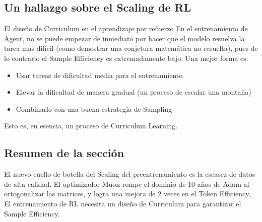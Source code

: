 \subsection{Un hallazgo sobre el Scaling de RL}

\begin{knowledgebox}{El diseño de Curriculum en el aprendizaje por refuerzo}
En el entrenamiento de Agent, no se puede empezar de inmediato por hacer que el modelo resuelva la tarea más difícil (como demostrar una conjetura matemática no resuelta), pues de lo contrario el Sample Efficiency es extremadamente bajo. Una mejor forma es:
\begin{itemize}
    \item Usar tareas de dificultad media para el entrenamiento
    \item Elevar la dificultad de manera gradual (un proceso de escalar una montaña)
    \item Combinarlo con una buena estrategia de Sampling
\end{itemize}
Esto es, en esencia, un proceso de Curriculum Learning.
\end{knowledgebox}

\subsection{Resumen de la sección}

El nuevo cuello de botella del Scaling del preentrenamiento es la escasez de datos de alta calidad. El optimizador Muon rompe el dominio de 10 años de Adam al ortogonalizar las matrices, y logra una mejora de 2 veces en el Token Efficiency. El entrenamiento de RL necesita un diseño de Curriculum para garantizar el Sample Efficiency.

